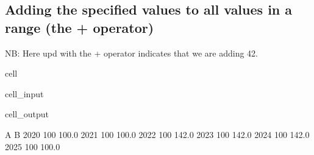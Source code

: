 \documentclass[letterpaper,10pt,english]{jupyterBook}
\begin{document}
\subsection{Adding  the specified  values to all values in a range (the + operator)}
\label{\detokenize{content/howto/update/model update:adding-the-specified-values-to-all-values-in-a-range-the-operator}}
\sphinxAtStartPar
NB: Here upd with the  + operator indicates that we are adding 42.

\begin{sphinxuseclass}{cell}\begin{sphinxVerbatimInput}

\begin{sphinxuseclass}{cell_input}
\begin{sphinxVerbatim}[commandchars=\\\{\}]
\end{sphinxVerbatim}

\end{sphinxuseclass}\end{sphinxVerbatimInput}
\begin{sphinxVerbatimOutput}

\begin{sphinxuseclass}{cell_output}
\begin{sphinxVerbatim}[commandchars=\\\{\}]
        A      B
2020  100  100.0
2021  100  100.0
2022  100  142.0
2023  100  142.0
2024  100  142.0
2025  100  100.0
\end{sphinxVerbatim}

\end{sphinxuseclass}\end{sphinxVerbatimOutput}

\end{sphinxuseclass}
\end{document}
